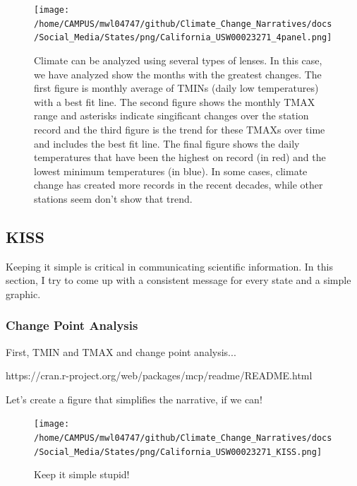 \documentclass{article}
\begin{document}
\begin{figure}
\texttt{[image: /home/CAMPUS/mwl04747/github/Climate\_Change\_Narratives/docs/Social\_Media/States/png/California\_USW00023271\_4panel.png]}
\caption{Climate can be analyzed using several types of lenses. In this case, we have analyzed show the months with the greatest changes. The first figure is monthly average of TMINs (daily low temperatures) with a best fit line. The second figure shows the monthly TMAX range and asterisks indicate singificant changes over the station record and the third figure is the trend for these TMAXs over time and includes the best fit line. The final figure shows the daily temperatures that have been the highest on record (in red) and the lowest minimum temperatures (in blue). In some cases, climate change has created more records in the recent decades, while other stations seem don't show that trend.}
\label{fig:4panel}
\end{figure}

\subsection{KISS}

Keeping it simple is critical in communicating scientific information. In this section, I try to come up with a consistent message for every state and a simple graphic. 

\subsubsection{Change Point Analysis}
First, TMIN and TMAX and change point analysis...

https://cran.r-project.org/web/packages/mcp/readme/README.html



Let's create a figure that simplifies the narrative, if we can!

\begin{knitrout}
\color{fgcolor}\begin{kframe}


{\ttfamily\noindent\bfseries\color{errorcolor}{\#\# Error in seq(min(GSOM\$Year), max(GSOM\$Year), by = 2): object 'GSOM' not found}}\end{kframe}
\end{knitrout}

\begin{figure}
\texttt{[image: /home/CAMPUS/mwl04747/github/Climate\_Change\_Narratives/docs/Social\_Media/States/png/California\_USW00023271\_KISS.png]}
\caption{Keep it simple stupid!}
\label{fig:GSOM-KISS}
\end{figure}
\end{document}
